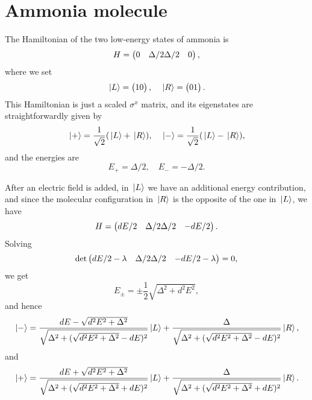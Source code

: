 \documentclass[hyperref, a4paper]{article}
\def\\{}%
\begin{document}
\section{Ammonia molecule}

The Hamiltonian of the two low-energy states of ammonia is 
\begin{equation}
    H = \pmqty{
        0 & \Delta / 2 \\
        \Delta / 2 & 0
    },
\end{equation}
where we set 
\begin{equation}
    \ket*{L} = \pmqty{1 \\ 0}, \quad
    \ket*{R} = \pmqty{0 \\ 1}.
\end{equation}
This Hamiltonian is just a scaled $\sigma^x$ matrix, 
and its eigenstates are straightforwardly given by 
\begin{equation}
    \ket*{+} = \frac{1}{\sqrt{2}} (\ket*{L} + \ket*{R}), \quad 
    \ket*{-} = \frac{1}{\sqrt{2}} (\ket*{L} - \ket*{R}),
\end{equation}
and the energies are 
\begin{equation}
    E_+ = \Delta / 2, \quad E_- = - \Delta / 2.
\end{equation}

After an electric field is added, 
in $\ket*{L}$ we have an additional energy contribution, 
and since the molecular configuration in $\ket*{R}$ is the opposite 
of the one in $\ket*{L}$, 
we have 
\begin{equation}
    H = \pmqty{
        dE / 2 & \Delta / 2 \\
        \Delta / 2 & -dE / 2
    }.
\end{equation}
Solving 
\[
    \det \pmqty{
        dE / 2 - \lambda & \Delta / 2 \\
        \Delta / 2 & -dE / 2 - \lambda
    }    = 0, 
\]
we get 
\begin{equation}
    E_\pm = \pm \frac{1}{2} \sqrt{\Delta^2 + d^2 E^2}, 
\end{equation}
and hence 
\begin{equation}
    \ket*{-} = \frac{dE - \sqrt{d^2 E^2 + \Delta^2}}{\sqrt{
        \Delta^2 + (\sqrt{d^2 E^2 + \Delta^2} - d E)^2
    }} \ket*{L} 
    + \frac{\Delta}{\sqrt{
        \Delta^2 + (\sqrt{d^2 E^2 + \Delta^2} - d E)^2}
    } \ket*{R}, 
\end{equation}
and 
\begin{equation}
    \ket*{+} = \frac{dE + \sqrt{d^2 E^2 + \Delta^2}}{\sqrt{
        \Delta^2 + (\sqrt{d^2 E^2 + \Delta^2} + d E)^2
    }} \ket*{L} 
    + \frac{\Delta}{\sqrt{
        \Delta^2 + (\sqrt{d^2 E^2 + \Delta^2} + d E)^2}
    } \ket*{R}.
\end{equation}
\end{document}
